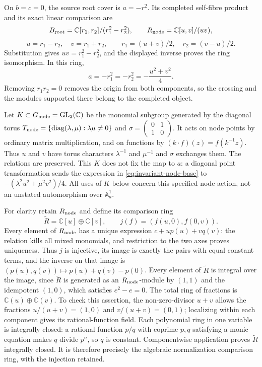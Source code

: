 On $b=c=0$, the source root cover is $a=-r^2$. Its completed
self-fibre product and its exact linear comparison are
\[
 B_{\rm root}=\mathbb C[r_1,r_2]/(r_1^2-r_2^2),\qquad
 R_{\rm node}=\mathbb C[u,v]/(uv),
\]
\[
 u=r_1-r_2,\quad v=r_1+r_2,\qquad
 r_1=(u+v)/2,\quad r_2=(v-u)/2.
\]
Substitution gives $uv=r_1^2-r_2^2$, and the displayed inverse proves
the ring isomorphism. In this ring,
\begin{equation}\label{eq:invariant-node-base}
 a=-r_1^2=-r_2^2=-\frac{u^2+v^2}{4}.
\end{equation}
Removing $r_1r_2=0$ removes the origin from both components, so the
crossing and the modules supported there belong to the completed object.

Let $K\subset G_{\rm node}=\operatorname{GL}_2(\mathbb C)$ be the monomial
subgroup generated by the diagonal torus
$T_{\rm node}=\{\operatorname{diag}(\lambda,\mu):\lambda\mu\ne0\}$
and $\sigma=\left(\begin{smallmatrix}0&1\\1&0\end{smallmatrix}\right)$.
It acts on node points by ordinary matrix multiplication, and on
functions by $(k\cdot f)(z)=f(k^{-1}z)$. Thus $u$ and $v$ have
torus characters $\lambda^{-1}$ and $\mu^{-1}$ and $\sigma$ exchanges
them. The relations are preserved. This $K$ does not fix the map to
$a$: a diagonal point transformation sends the expression in
\eqref{eq:invariant-node-base} to
$-(\lambda^2u^2+\mu^2v^2)/4$. All uses of $K$ below concern this
specified node action, not an unstated automorphism over $\mathbb A^1_a$.

For clarity retain $R_{\rm node}$ and define its comparison ring
\[
 \widetilde R=\mathbb C[u]\oplus\mathbb C[v],\qquad
 j(f)=(f(u,0),f(0,v)).
\]
Every element of $R_{\rm node}$ has a unique expression
$c+u p(u)+v q(v)$: the relation kills all mixed monomials, and
restriction to the two axes proves uniqueness. Thus $j$ is injective,
its image is exactly the pairs with equal constant terms, and the
inverse on that image is $(p(u),q(v))\mapsto p(u)+q(v)-p(0)$.
Every element of $\widetilde R$ is integral over the image, since
$\widetilde R$ is generated as an $R_{\rm node}$-module by $(1,1)$
and the idempotent $(1,0)$, which satisfies $e^2-e=0$.
The total ring of fractions is $\mathbb C(u)\oplus\mathbb C(v)$.
To check this assertion, the non-zero-divisor $u+v$ allows the
fractions $u/(u+v)=(1,0)$ and $v/(u+v)=(0,1)$; localizing within
each component gives its rational-function field. Each polynomial
ring in one variable is integrally closed: a rational function
$p/q$ with coprime $p,q$ satisfying a monic equation makes $q$
divide $p^{n}$, so $q$ is constant. Componentwise application proves
$\widetilde R$ integrally closed. It is therefore precisely the
algebraic normalization comparison ring, with the injection retained.


